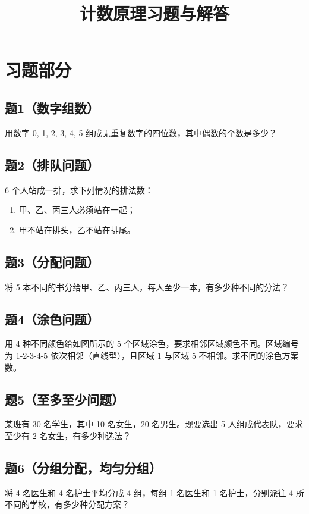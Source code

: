 \documentclass[10pt]{article}
\title{计数原理习题与解答}
\author{}
\date{}
\begin{document}
\maketitle

\section*{习题部分}

\subsection*{题1（数字组数）}
用数字 0, 1, 2, 3, 4, 5 组成无重复数字的四位数，其中偶数的个数是多少？

\subsection*{题2（排队问题）}
6 个人站成一排，求下列情况的排法数：
\begin{enumerate}
\item 甲、乙、丙三人必须站在一起；
\item 甲不站在排头，乙不站在排尾。
\end{enumerate}

\subsection*{题3（分配问题）}
将 5 本不同的书分给甲、乙、丙三人，每人至少一本，有多少种不同的分法？

\subsection*{题4（涂色问题）}
用 4 种不同颜色给如图所示的 5 个区域涂色，要求相邻区域颜色不同。区域编号为 1-2-3-4-5 依次相邻（直线型），且区域 1 与区域 5 不相邻。求不同的涂色方案数。

\subsection*{题5（至多至少问题）}
某班有 30 名学生，其中 10 名女生，20 名男生。现要选出 5 人组成代表队，要求至少有 2 名女生，有多少种选法？

\subsection*{题6（分组分配，均匀分组）}
将 4 名医生和 4 名护士平均分成 4 组，每组 1 名医生和 1 名护士，分别派往 4 所不同的学校，有多少种分配方案？
\end{document}
